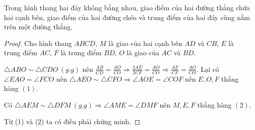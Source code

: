 \begin{lemma}
	Trong hình thang hai đáy không bằng nhau, giao điểm của hai đường thẳng chứa hai cạnh bên, giao điểm của hai đường chéo và trung điểm của hai đáy cùng nằm trên một đường thẳng.
\end{lemma}

\begin{center}

\end{center}

\begin{proof}
	Cho hình thang $ABCD$, $M$ là giao của hai cạnh bên $AD$ và $CB$, $E$ là trung điểm $AC$, $F$ là trung điểm $BD$, $O$ là giao của $AC$ và $BD$.

	$\triangle ABO \sim \triangle CDO \ (g.g)$ nên $\frac{AB}{CD} = \frac{AO}{CO} \Rightarrow \frac{2AE}{2CF} = \frac{AO}{CO} \Rightarrow \frac{AE}{CF} = \frac{AO}{CO}$. Lại có $\angle EAO = \angle FCO$ nên $\triangle AEO \sim \triangle CFO \Rightarrow \angle AOE = \angle COF$ nên $E, O, F$ thẳng hàng $(1)$.

	Có $\triangle AEM \sim \triangle DFM \ (g.g) \Rightarrow \angle AME = \angle DMF$ nên $M, E, F$ thẳng hàng $(2)$. 

	Từ (1) và (2) ta có điều phải chứng minh.
\end{proof}